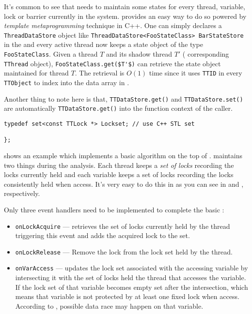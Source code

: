 It's common to see that \Tracer{} needs to maintain some states for every thread, variable, lock or barrier currently in the system. \ThreadTracer{} provides an easy way to do so powered by \textit{template metaprogramming} technique in C++. One can simply declares a \verb|ThreadDataStore| object like \lstinline[basicstyle=\ttfamily\normalsize]|ThreadDataStore<FooStateClass> BarStateStore| in the \Tracer{} and every active thread now keeps a state object of the type \verb|FooStateClass|. Given a thread $T$ and its shadow thread $T'$ (\ie{} corresponding \verb|TThread| object), \lstinline[basicstyle=\ttfamily\normalsize,mathescape]|FooStateClass.get($T'$)| can retrieve the state object maintained for thread $T$. The retrieval is $O(1)$ time since it uses \verb|TTID| in every \verb|TTObject| to index into the data array in .

Another thing to note here is that, \lstinline[basicstyle=\ttfamily\normalsize]|TTDataStore.get()| and \lstinline[basicstyle=\ttfamily\normalsize]|TTDataStore.set()| are automatically  \lstinline[basicstyle=\ttfamily\normalsize]|TTDataStore.get()| into the function context of the caller.

\begin{lstlisting}[caption={\texttt{EraserTracer} class},label={l:EraserTracer}]
typedef set<const TTLock *> Lockset; // use C++ STL set
 
};
\end{lstlisting}

 shows an example which implements a basic \Eraser{} \Lockset{} algorithm on the top of \ThreadTracer{}. \Eraser{} maintains two things during the analysis. Each thread keeps a \textit{set of locks} recording the locks currently held and each variable keeps a set of locks recording the locks consistently held when access. It's very easy to do this in \ThreadTracer{} as you can see in  and , respectively.

Only three event handlers need to be implemented to complete the basic \Lockset{} \Tracer{}:
\begin{itemize}
	\item \verb|onLockAcquire| ---  retrieves the set of locks currently held by the thread triggering this event and  adds the acquired lock to the set.
	\item \verb|onLockRelease| --- Remove the lock from the lock set held by the thread.
	\item \verb|onVarAccess| ---  updates the lock set associated with the accessing variable by intersecting it with the set of locks held the thread that accesses the variable. If the lock set of that variable becomes empty set after the intersection, which means that variable is not protected by at least one fixed lock when access. According to \Eraser{}, possible data race may happen on that variable.
\end{itemize}

